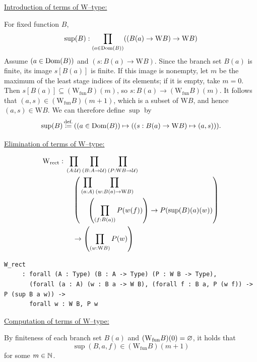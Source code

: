 \underline{Introduction of terms of W--type:}\\
\begin{definition}
For fixed function $B$,
\[
\sup(B):\prod_{(a\in \mathrm{Dom}(B))}((B(a)\to\mbox{W}B)\to \mbox{W}B)
\]
Assume $(a\in \mathrm{Dom}(B))$ and $(s:B(a)\to\mbox{W}B)$. Since the branch
set $B(a)$ is finite, its image $s[B(a)]$ is finite. If this image is
nonempty, let $m$ be the maximum of the least stage indices of its
elements; if it is empty, take $m=0$. Then
$s[B(a)]\subseteq (\mbox{W}_{\mathrm{fun}}B)(m)$, so
$s:B(a)\to(\mbox{W}_{\mathrm{fun}}B)(m)$. It follows that
$(a,s)\in (\mbox{W}_{\mathrm{fun}}B)(m+1)$, which is a subset of
$\mbox{W}B$, and hence $(a,s)\in\mbox{W}B$. We can therefore define
$\sup$ by
\[
\sup(B) \,{\stackrel{{\textrm{def.}}}{\coloneqq}}\, ((a\in \mathrm{Dom}(B))\mapsto ((s:B(a)\to\mbox{W}B)\mapsto (a,s)) ).
\]
\end{definition}

\underline{Elimination of terms of W--type:}\\
\begin{definition}
\[
\begin{aligned}
\mbox{W}_\mathrm{rect}:{}&
\prod_{(A : \mathcal{U})} \prod_{(B : A \to \mathcal{U})} \prod_{(P : \mathrm{W}B\to \mathcal{U})}\\
&\quad\left(\begin{aligned}
&\prod_{(a : A)} \prod_{(w : B(a) \to \mathrm{W}B)}\\
&\quad\left(\prod_{(f : B(a))} P(w(f))\right)\to P(\sup(B)(a)(w))
\end{aligned}\right)\\
&\quad\to\left(\prod_{(w : \mathrm{W}B)} P(w)\right)
\end{aligned}
\]
\begin{lstlisting}
W_rect
     : forall (A : Type) (B : A -> Type) (P : W B -> Type),
       (forall (a : A) (w : B a -> W B), (forall f : B a, P (w f)) -> P (sup B a w)) ->
       forall w : W B, P w
\end{lstlisting}
\end{definition}

\underline{Computation of terms of W--type:}

By finiteness of each branch set $B(a)$ and $(\mbox{W}_{\mathrm{fun}}B)(0)=\varnothing$, it holds that
\[
\sup(B,a,f)\in (\mbox{W}_{\mathrm{fun}}B)(m+1)
\]
for some $m\in\mathbb{N}$.


